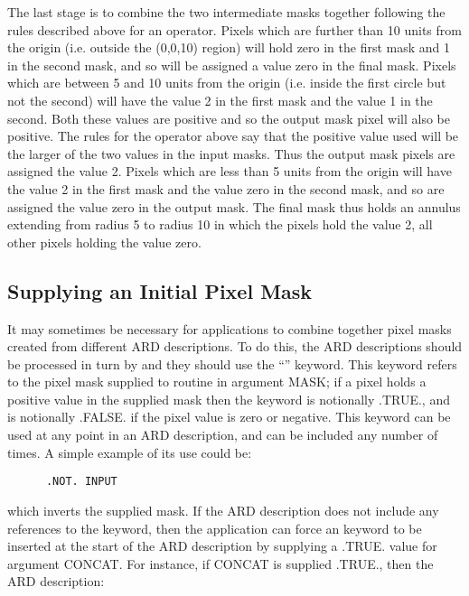The last stage is to combine the two intermediate masks together following the
rules described above for an  operator. Pixels which are further than 10
units from the origin (i.e. outside the (0,0,10) region) will hold zero in
the first mask and 1 in the second mask, and so will be assigned a
value zero in the final mask. Pixels which are between 5 and 10 units from the
origin (i.e. inside the first circle but not the second) will have the value 2
in the first mask and the value 1 in the second. Both these values are
positive and so the output mask pixel will also be positive. The rules for the
 operator above say that the positive value used will be the larger of the
two values in the input masks. Thus the output mask pixels are assigned the
value 2. Pixels which are less than 5 units from the origin will have the value
2 in the first mask and the value zero in the second mask, and so are assigned
the value zero in the output mask. The final mask thus holds an annulus 
extending from radius 5 to radius 10 in which the pixels hold the value 2, all
other pixels holding the value zero.

\subsection{\label{SEC:MASK}Supplying an Initial Pixel Mask}
It may sometimes be necessary for applications to combine together pixel masks
created from different ARD descriptions. To do this, the ARD descriptions should
be processed in turn by  and they should use the ``'' keyword.
This keyword refers to the pixel mask supplied to routine  in argument
MASK; if a pixel holds a positive value in the supplied mask then the 
keyword is notionally .TRUE., and is notionally .FALSE. if the pixel value is
zero or negative. This keyword can be used at any point in an ARD description,
and can be included any number of times. A simple example of its use could be: 

\small
\begin{verbatim}
      .NOT. INPUT
\end{verbatim}
\normalsize

which inverts the supplied mask. If the ARD description does not include any
references to the  keyword, then the application can force an  keyword
to be inserted at the start of the ARD description by supplying a .TRUE. value
for  argument CONCAT. For instance, if CONCAT is supplied .TRUE., then
the ARD description: 

